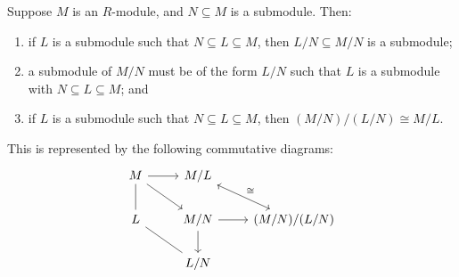 \begin{theorem}\label{thm:iso-3-mod}
    Suppose \(M\) is an \(R\)-module,
    and \(N \subseteq M\) is a submodule.
    Then:
    \begin{enumerate}[label={(\alph*)}, itemsep=0mm]
        \item if \(L\) is a submodule such that \(N \subseteq L \subseteq M\),
            then \(L/N \subseteq M/N\) is a submodule;
        \item a submodule of \(M/N\) must be of the form \(L/N\)
            such that \(L\) is a submodule with \(N \subseteq L \subseteq M\); and
        \item if \(L\) is a submodule such that \(N \subseteq L \subseteq M\),
            then \((M/N)/(L/N) \cong M/L\).
    \end{enumerate}

    This is represented by the following commutative diagrams:
    \begin{equation*}
        \begin{tikzcd}
            M \arrow{r} \arrow[dash]{d} \arrow{rd} &
            M/L \arrow[leftrightarrow]{rd}{\cong} \\
            L \arrow[dash]{rd} & M/N \arrow{r} \arrow{d} & (M/N)/(L/N) \\
            & L/N
        \end{tikzcd}
    \end{equation*}
\end{theorem}
